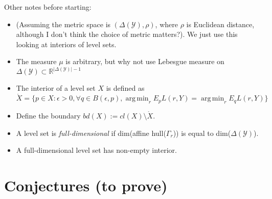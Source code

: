 \documentclass[12pt]{article}
\newcommand{\reals}{\mathbb{R}}
\newcommand{\Y}{\mathcal{Y}}
\newcommand{\inter}[1]{\mathring{#1}}%
\DeclareMathOperator*{\argmin}{arg\,min}
\begin{document}
Other notes before starting:
\begin{itemize}
\item (Assuming the metric space is $(\Delta(\Y), \rho)$, where $\rho$ is Euclidean distance, although I don't think the choice of metric matters?).
We just use this looking at interiors of level sets.
\item The measure $\mu$ is arbitrary, but why not use Lebesgue measure on $\Delta(\Y) \subset \reals^{|\Delta(\Y)|-1}$
\item The interior of a level set $X$ is defined as $\inter{X} = \{p \in X: \epsilon > 0,  \forall q \in B(\epsilon,p), \argmin_rE_p L(r,Y) = \argmin_r E_q L(r,Y)\}$
\item Define the boundary $bd(X) := cl(X) \setminus \inter{X}$.
\item A level set is \emph{full-dimensional} if dim(affine hull($\Gamma_r$)) is equal to dim($\Delta(\Y)$). 
\item A full-dimensional level set has non-empty interior.
\end{itemize}

\section{Conjectures (to prove)}
\end{document}
